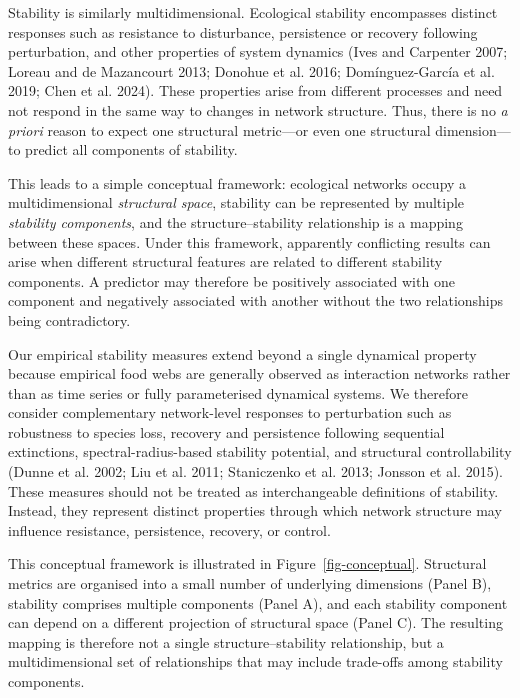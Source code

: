 \documentclass[
]{article}
\begin{document}
Stability is similarly multidimensional. Ecological stability
encompasses distinct responses such as resistance to disturbance,
persistence or recovery following perturbation, and other properties of
system dynamics (Ives and Carpenter 2007; Loreau and de Mazancourt 2013;
Donohue et al. 2016; Domínguez-García et al. 2019; Chen et al. 2024).
These properties arise from different processes and need not respond in
the same way to changes in network structure. Thus, there is no \emph{a
priori} reason to expect one structural metric---or even one structural
dimension---to predict all components of stability.

This leads to a simple conceptual framework: ecological networks occupy
a multidimensional \emph{structural space}, stability can be represented
by multiple \emph{stability components}, and the structure--stability
relationship is a mapping between these spaces. Under this framework,
apparently conflicting results can arise when different structural
features are related to different stability components. A predictor may
therefore be positively associated with one component and negatively
associated with another without the two relationships being
contradictory.

Our empirical stability measures extend beyond a single dynamical
property because empirical food webs are generally observed as
interaction networks rather than as time series or fully parameterised
dynamical systems. We therefore consider complementary network-level
responses to perturbation such as robustness to species loss, recovery
and persistence following sequential extinctions, spectral-radius-based
stability potential, and structural controllability (Dunne et al. 2002;
Liu et al. 2011; Staniczenko et al. 2013; Jonsson et al. 2015). These
measures should not be treated as interchangeable definitions of
stability. Instead, they represent distinct properties through which
network structure may influence resistance, persistence, recovery, or
control.

This conceptual framework is illustrated in Figure~\ref{fig-conceptual}.
Structural metrics are organised into a small number of underlying
dimensions (Panel B), stability comprises multiple components (Panel A),
and each stability component can depend on a different projection of
structural space (Panel C). The resulting mapping is therefore not a
single structure--stability relationship, but a multidimensional set of
relationships that may include trade-offs among stability components.
\end{document}
